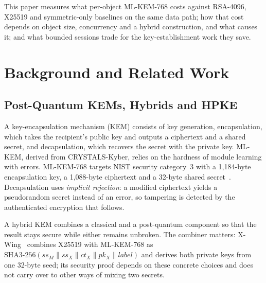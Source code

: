 \documentclass[review,12pt]{elsarticle}
\begin{document}
This paper measures what per-object ML-KEM-768 costs against RSA-4096, X25519 and
symmetric-only baselines on the same data path; how that cost depends on object size,
concurrency and a hybrid construction, and what causes it; and what bounded sessions trade
for the key-establishment work they save.

\section{Background and Related Work}\label{sec:background}\label{sec:related}
\subsection{Post-Quantum KEMs, Hybrids and HPKE}\label{sec:kems}
A key-encapsulation mechanism (KEM) consists of key generation, encapsulation, which takes the
recipient's public key and outputs a ciphertext and a shared secret, and decapsulation, which
recovers the secret with the private key. ML-KEM, derived from CRYSTALS-Kyber, relies on the
hardness of module learning with errors. ML-KEM-768 targets NIST security category~3 with a
1{,}184-byte encapsulation key, a 1{,}088-byte ciphertext and a 32-byte shared
secret~\cite{fips203}. Decapsulation uses \emph{implicit rejection}: a modified ciphertext yields
a pseudorandom secret instead of an error, so tampering is detected by the authenticated
encryption that follows.

A hybrid KEM combines a classical and a post-quantum component so that the result stays secure
while either remains unbroken. The combiner matters: X-Wing~\cite{barbosa2024,xwing} combines
X25519 with ML-KEM-768 as
$\mathrm{SHA3\mbox{-}256}(ss_M\|ss_X\|ct_X\|pk_X\|\mathit{label})$ and derives both private keys
from one 32-byte seed; its security proof depends on these concrete choices and does not carry
over to other ways of mixing two secrets.
\end{document}
